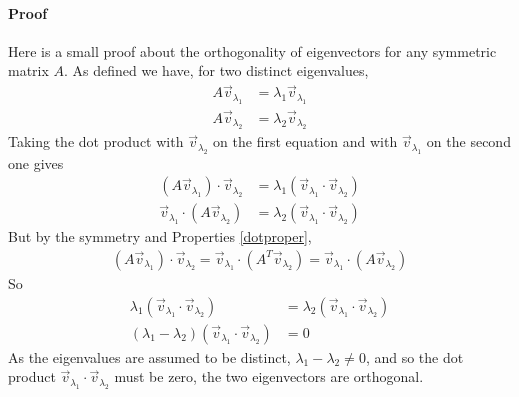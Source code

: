 \paragraph{Proof} Here is a small proof about the orthogonality of eigenvectors for any symmetric matrix $A$. As defined we have, for two distinct eigenvalues,
\begin{align*}
A\vec{v}_{\lambda_1} &= \lambda_1 \vec{v}_{\lambda_1} \\
A\vec{v}_{\lambda_2} &= \lambda_2 \vec{v}_{\lambda_2}
\end{align*}
Taking the dot product with $\vec{v}_{\lambda_2}$ on the first equation and with $\vec{v}_{\lambda_1}$ on the second one gives
\begin{align*}
(A\vec{v}_{\lambda_1}) \cdot \vec{v}_{\lambda_2} &= \lambda_1 (\vec{v}_{\lambda_1} \cdot \vec{v}_{\lambda_2}) \\
\vec{v}_{\lambda_1} \cdot (A\vec{v}_{\lambda_2}) &= \lambda_2 (\vec{v}_{\lambda_1} \cdot \vec{v}_{\lambda_2})
\end{align*}
But by the symmetry and Properties \ref{dotproper},
\begin{align*}
(A\vec{v}_{\lambda_1}) \cdot \vec{v}_{\lambda_2} = \vec{v}_{\lambda_1} \cdot (A^T\vec{v}_{\lambda_2}) = \vec{v}_{\lambda_1} \cdot (A\vec{v}_{\lambda_2})
\end{align*}
So
\begin{align*}
\lambda_1 (\vec{v}_{\lambda_1} \cdot \vec{v}_{\lambda_2}) &= \lambda_2 (\vec{v}_{\lambda_1} \cdot \vec{v}_{\lambda_2}) \\
(\lambda_1 - \lambda_2)(\vec{v}_{\lambda_1} \cdot \vec{v}_{\lambda_2}) &= 0
\end{align*}
As the eigenvalues are assumed to be distinct, $\lambda_1 - \lambda_2 \neq 0$, and so the dot product $\vec{v}_{\lambda_1} \cdot \vec{v}_{\lambda_2}$ must be zero, the two eigenvectors are orthogonal.

